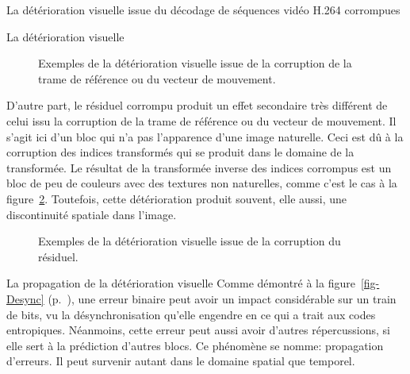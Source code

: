 \documentclass[letterpaper, twoside, 12pt,memoire]{thETS}
\newcommand{\fig}[1]{figure~\ref{#1}}
\newcommand{\page}[1]{(p.~\pageref{#1})}
\newcommand{\SC}[1]{%
	{
	\todo[inline,color={red!100!green!33!}]{%
	\textbf{[SC]:}~#1}
	}}
\begin{document}
\begin{chapter}{La détérioration visuelle issue du décodage de séquences vidéo
H.264 corrompues}
\begin{section}{La détérioration visuelle}
\begin{figure}[htb]
{\begin{varwidth}{\textwidth}
\end{varwidth}}
\caption{Exemples de la détérioration visuelle issue de la corruption de la
trame de référence ou du vecteur de mouvement.}
\label{fig-VectorsBad}
\end{figure}

D'autre part, le résiduel corrompu produit un effet secondaire très différent de
celui issu la corruption de la trame de référence ou du vecteur de mouvement.
Il s'agit ici d'un bloc qui n'a pas l'apparence d'une image naturelle. Ceci est
dû à la corruption des indices transformés qui se produit dans le domaine de la
transformée. Le résultat de la transformée inverse des indices corrompus est un
bloc de peu de couleurs avec des textures non naturelles, comme c'est le cas à
la \fig{fig-ResBad}. Toutefois, cette détérioration produit souvent, elle aussi,
une discontinuité spatiale dans l'image.

\SC{Toujours peu de couleurs? enlever?}

\begin{figure}[htb]
\caption{Exemples de la détérioration visuelle issue de la corruption du
résiduel.}
\label{fig-ResBad}
\end{figure}

\end{section}

\begin{section}{La propagation de la détérioration visuelle}
\label{sect-propagation}
Comme démontré à la \fig{fig-Desync} \page{fig-Desync}, une erreur
binaire peut avoir un impact considérable sur un train de bits, vu la
désynchronisation qu'elle engendre en ce qui a trait aux codes entropiques.
Néanmoins, cette erreur peut aussi avoir d'autres répercussions, si elle sert à
la prédiction d'autres blocs. Ce phénomène se nomme: propagation d'erreurs. Il
peut survenir autant dans le domaine spatial que temporel.


\end{section}
\end{chapter}
\end{document}
